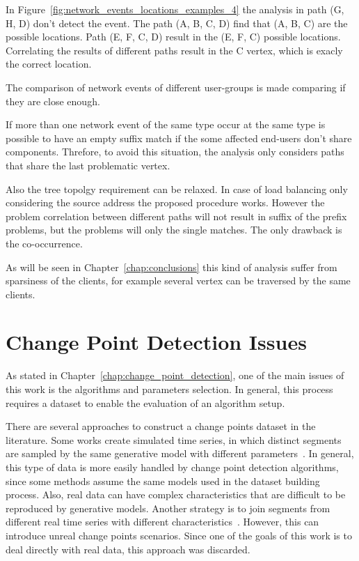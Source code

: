 In Figure~\ref{fig:network_events_locations_examples_4} the analysis in path
(G, H, D) don't detect the event. The path (A, B, C, D) find that (A, B, C) are
the possible locations. Path (E, F, C, D) result in the (E, F, C) possible
locations. Correlating the results of different paths result in the C vertex,
which is exacly the correct location.

The comparison of network events of different user-groups is made comparing if
they are close enough.

If more than one network event of the same type occur at the same type is
possible to have an empty suffix match if the some affected end-users don't
share components. Threfore, to avoid this situation, the analysis only
considers paths that share the last problematic vertex.

Also the tree topolgy requirement can be relaxed. In case of load balancing
only considering the source address the proposed procedure works. However the
problem correlation between different paths will not result in suffix of the
prefix problems, but the problems will only the single matches. The only
drawback is the co-occurrence.

As will be seen in Chapter~\ref{chap:conclusions} this kind of analysis suffer
from sparsiness of the clients, for example several vertex can be traversed by
the same clients.

\section{Change Point Detection Issues}

As stated in Chapter~\ref{chap:change_point_detection}, one of the main issues
of this work is the algorithms and parameters selection.
In general, this process requires a dataset to enable the evaluation of an
algorithm setup.

There are several approaches to construct a
change points dataset in the literature.
Some works create simulated time series, in which distinct segments are sampled
by the same generative model with different
parameters~\cite{change_point_detection_in_time_series_data_by_relative_density_ratio_estimation}.
In general, this type of data is more easily handled by change point detection
algorithms, since some methods assume the same models used in the dataset
building process. Also, real data can have complex characteristics that are
difficult to be reproduced by generative models. Another strategy is to join
segments from different real time series with different
characteristics~\cite{inertial_hidden_markov_models_modeling_change_in_multivariate_time_series}.
However, this can introduce unreal change points scenarios. Since one of
the goals of this work is to deal directly with real data,
this approach was discarded.

